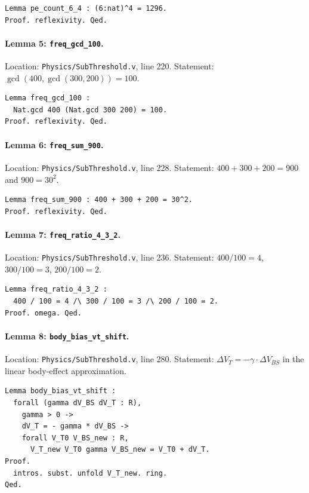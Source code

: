 \begin{verbatim}
Lemma pe_count_6_4 : (6:nat)^4 = 1296.
Proof. reflexivity. Qed.
\end{verbatim}

\paragraph{Lemma 5: \texttt{freq_gcd_100}.}
Location: \texttt{Physics/SubThreshold.v}, line 220.
Statement: $\gcd(400, \gcd(300, 200)) = 100$.

\begin{verbatim}
Lemma freq_gcd_100 :
  Nat.gcd 400 (Nat.gcd 300 200) = 100.
Proof. reflexivity. Qed.
\end{verbatim}

\paragraph{Lemma 6: \texttt{freq\_sum\_900}.}
Location: \texttt{Physics/SubThreshold.v}, line 228.
Statement: $400 + 300 + 200 = 900$ and $900 = 30^2$.

\begin{verbatim}
Lemma freq_sum_900 : 400 + 300 + 200 = 30^2.
Proof. reflexivity. Qed.
\end{verbatim}

\paragraph{Lemma 7: \texttt{freq\_ratio\_4\_3\_2}.}
Location: \texttt{Physics/SubThreshold.v}, line 236.
Statement: $400/100 = 4$, $300/100 = 3$, $200/100 = 2$.

\begin{verbatim}
Lemma freq_ratio_4_3_2 :
  400 / 100 = 4 /\ 300 / 100 = 3 /\ 200 / 100 = 2.
Proof. omega. Qed.
\end{verbatim}

\paragraph{Lemma 8: \texttt{body\_bias\_vt\_shift}.}
Location: \texttt{Physics/SubThreshold.v}, line 280.
Statement: $\Delta V_T = -\gamma \cdot \Delta V_{BS}$ in the linear body-effect approximation.

\begin{verbatim}
Lemma body_bias_vt_shift :
  forall (gamma dV_BS dV_T : R),
    gamma > 0 ->
    dV_T = - gamma * dV_BS ->
    forall V_T0 V_BS_new : R,
      V_T_new V_T0 gamma V_BS_new = V_T0 + dV_T.
Proof.
  intros. subst. unfold V_T_new. ring.
Qed.
\end{verbatim}


